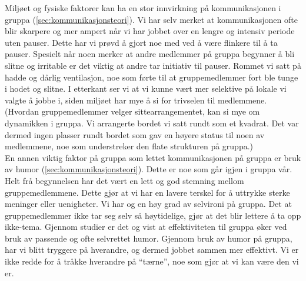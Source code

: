 
Miljøet og fysiske faktorer kan ha en stor innvirkning på kommunikasjonen i
gruppa (\ref{sec:kommunikasjonsteori}). Vi har selv
merket at kommunikasjonen ofte blir skarpere og mer ampert når vi har jobbet over en lengre og
intensiv periode uten pauser. Dette har vi prøvd å gjort noe med ved å være flinkere til å ta
pauser. Spesielt når noen merker at andre medlemmer på gruppa begynner å bli slitne og irritable
er det viktig at andre tar initiativ til pauser. Rommet vi satt på hadde og dårlig ventilasjon,
noe som førte til at gruppemedlemmer fort ble tunge i hodet og slitne. I etterkant ser vi at
vi kunne vært mer selektive på lokale vi valgte å jobbe i, siden miljøet har mye å si for 
trivselen til medlemmene. (Hvordan gruppemedlemmer velger sittearrangementet, kan si mye om 
dynamikken i gruppa. Vi arrangerte bordet vi satt rundt som et kvadrat. Det var dermed ingen
plasser rundt bordet som gav en høyere status til noen av medlemmene, noe som understreker den 
flate strukturen på gruppa.)\\

En annen viktig faktor på gruppa som lettet kommunikasjonen på gruppa er bruk
av humor (\ref{sec:kommunikasjonsteori}). Dette er noe
som går igjen i gruppa vår. Helt frå begynnelsen har det vært en lett og god stemning mellom gruppemedlemmene. 
Dette gjør at vi har en lavere terskel for å uttrykke sterke meninger eller uenigheter. Vi har og en høy grad 
av selvironi på gruppa. Det at gruppemedlemmer ikke tar seg selv så høytidelige, gjør at det blir lettere å ta 
opp ikke-tema. Gjennom studier er det og vist at effektiviteten til gruppa øker ved bruk av passende og ofte 
selvrettet humor. Gjennom bruk av humor på gruppa, har vi blitt tryggere på hverandre, og dermed jobbet sammen 
mer effektivt. Vi er ikke redde for å tråkke hverandre på ``tærne'', noe som
gjør at vi kan være den vi er. \\


